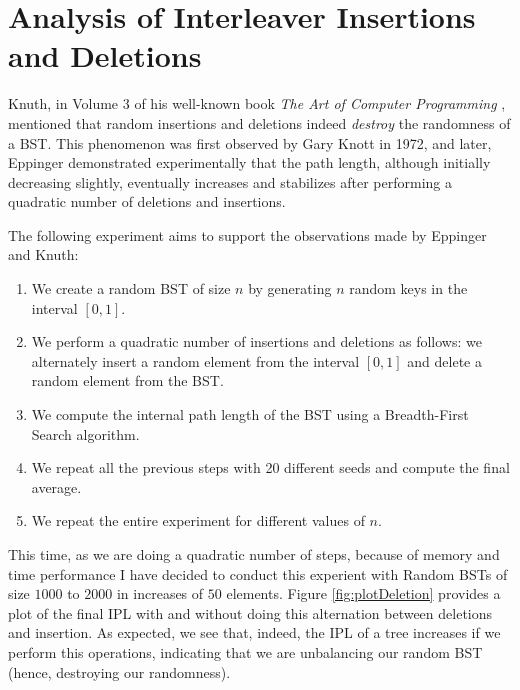\section{Analysis of Interleaver Insertions and Deletions}
Knuth, in Volume 3 of his well-known book \textit{The Art of Computer Programming} \cite{knuth1998art}, mentioned that random insertions and deletions indeed \textit{destroy} the randomness of a BST. This phenomenon was first observed by Gary Knott in 1972, and later, Eppinger \cite{eppinger1983empirical} demonstrated experimentally that the path length, although initially decreasing slightly, eventually increases and stabilizes after performing a quadratic number of deletions and insertions.

The following experiment aims to support the observations made by Eppinger and Knuth:
\begin{enumerate}
    \item We create a random BST of size \( n \) by generating \( n \) random keys in the interval \( [0,1] \).
    \item We perform a quadratic number of insertions and deletions as follows: we alternately insert a random element from the interval \( [0,1] \) and delete a random element from the BST.
    \item We compute the internal path length of the BST using a Breadth-First Search algorithm.
    \item We repeat all the previous steps with 20 different seeds and compute the final average.
    \item We repeat the entire experiment for different values of \( n \).
\end{enumerate}

This time, as we are doing a quadratic number of steps, because of memory and time performance I have decided to conduct this experient with Random BSTs of size $1000$ to $2000$ in increases of $50$ elements. Figure \ref{fig:plotDeletion} provides a plot of the final IPL with and without doing this alternation between deletions and insertion. As expected, we see that, indeed, the IPL of a tree increases if we perform this operations, indicating that we are unbalancing our random BST (hence, destroying our randomness).

